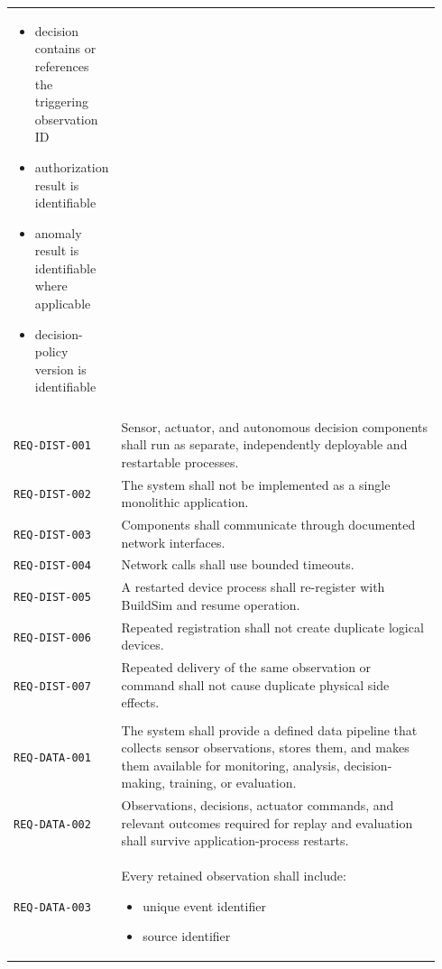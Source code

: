 \documentclass[11pt]{article}
\providecommand{\tightlist}{\setlength{\itemsep}{0pt}\setlength{\parskip}{0pt}}
\begin{document}
\begin{longtable}[]{@{}
>{\raggedright\arraybackslash}p{0.18\linewidth}
>{\raggedright\arraybackslash}p{0.76\linewidth}@{}}
\begin{itemize}
\item decision contains or references the triggering observation ID
\item authorization result is identifiable
\item anomaly result is identifiable where applicable
\item decision-policy version is identifiable
\end{itemize} \\
\addlinespace[3pt]
\multicolumn{2}{@{}l}{\textbf{Distributed-system requirements}} \\[2pt]
\texttt{REQ-DIST-001} & Sensor, actuator, and autonomous decision components shall run as separate, independently deployable and restartable processes. \\
\addlinespace[3pt]
\texttt{REQ-DIST-002} & The system shall not be implemented as a single monolithic application. \\
\addlinespace[3pt]
\texttt{REQ-DIST-003} & Components shall communicate through documented network interfaces. \\
\addlinespace[3pt]
\texttt{REQ-DIST-004} & Network calls shall use bounded timeouts. \\
\addlinespace[3pt]
\texttt{REQ-DIST-005} & A restarted device process shall re-register with BuildSim and resume operation. \\
\addlinespace[3pt]
\texttt{REQ-DIST-006} & Repeated registration shall not create duplicate logical devices. \\
\addlinespace[3pt]
\texttt{REQ-DIST-007} & Repeated delivery of the same observation or command shall not cause duplicate physical side effects. \\
\addlinespace[3pt]
\multicolumn{2}{@{}l}{\textbf{Data-pipeline requirements}} \\[2pt]
\texttt{REQ-DATA-001} & The system shall provide a defined data pipeline that collects sensor observations, stores them, and makes them available for monitoring, analysis, decision-making, training, or evaluation. \\
\addlinespace[3pt]
\texttt{REQ-DATA-002} & Observations, decisions, actuator commands, and relevant outcomes required for replay and evaluation shall survive application-process restarts. \\
\addlinespace[3pt]
\texttt{REQ-DATA-003} & Every retained observation shall include:
\begin{itemize}\tightlist
\item unique event identifier
\item source identifier

\end{itemize}
\end{longtable}
\end{document}
